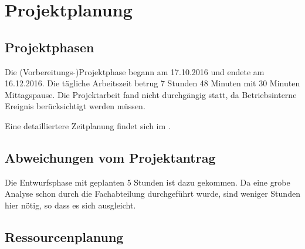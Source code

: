 

\section{Projektplanung} 
\label{sec:Projektplanung}


\subsection{Projektphasen}
\label{sec:Projektphasen}

Die (Vorbereitungs-)Projektphase begann am 17.10.2016 und endete am 16.12.2016.
Die tägliche Arbeitszeit betrug 7 Stunden 48 Minuten mit 30 Minuten Mittagspause.
Die Projektarbeit fand nicht durchgängig statt, da Betriebsinterne Ereignis berücksichtigt werden müssen.


Eine detailliertere Zeitplanung findet sich im .

\subsection{Abweichungen vom Projektantrag}
\label{sec:AbweichungenProjektantrag}

Die Entwurfsphase mit geplanten 5 Stunden ist dazu gekommen. 
Da eine grobe Analyse schon durch die Fachabteilung durchgeführt wurde, sind weniger Stunden hier nötig, so dass es sich ausgleicht.

\subsection{Ressourcenplanung}
\label{sec:Ressourcenplanung}

